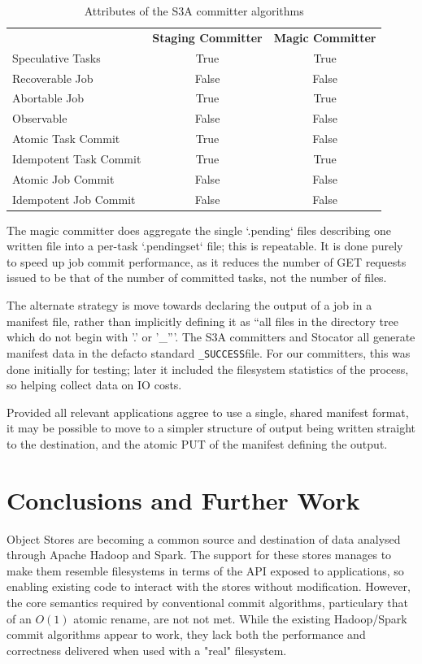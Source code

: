 \documentclass[conference]{IEEEtran}
\newcommand{\SUCCESS}{\texttt{\_SUCCESS}}
\begin{document}
\begin{table}
  \label{tab:s3a-committer-attributes}
  \begin{tabular}{ l c c }
    \hline
    & \textbf{Staging Committer} & \textbf{Magic Committer} \\
    Speculative Tasks & True & True \\
    Recoverable Job & False & False \\
    Abortable Job & True & True \\
    Observable & False & False \\
    Atomic Task Commit & True & False \\
    Idempotent Task Commit & True & True \\
    Atomic Job Commit & False & False \\
    Idempotent Job Commit & False & False \\
    \hline
  \end{tabular}
  \caption{Attributes of the S3A committer algorithms}
\end{table}


The magic committer does aggregate the single `.pending` files describing
one written file into a per-task `.pendingset` file;
this is repeatable.
It is done purely to speed up job commit performance, as it reduces the
number of GET requests issued to be that of the number of committed tasks,
not the number of files.


The alternate strategy is move towards declaring the output of a job in
a manifest file, rather than implicitly defining it as ``all files in the directory
tree which do not begin with '.' or '\_'''.
The S3A committers and Stocator all generate manifest data in the defacto
standard \SUCCESS file.
For our committers, this was done initially for testing;
later it included the filesystem statistics of the process, so helping
collect data on IO costs.

Provided all relevant applications aggree to use a single, shared manifest
format, it may be possible to move to a simpler structure of
output being written straight to the destination, and the atomic PUT of the
manifest defining the output.


\section{Conclusions and Further Work}
\label{sec:conclusions}

Object Stores are becoming a common source and destination of data analysed
through Apache Hadoop and Spark.
The support for these stores manages to make them resemble filesystems in
terms of the API exposed to applications, so enabling existing code to
interact with the stores without modification.
However, the core semantics required by conventional commit algorithms, particulary
that of an $O(1)$ atomic rename, are not not met.
While the existing Hadoop/Spark commit algorithms appear to work, they lack
both the performance and correctness delivered when used with a "real" filesystem.
\end{document}
